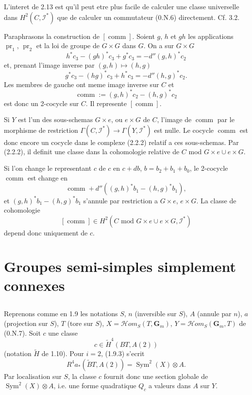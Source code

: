 \documentclass[11pt,a4paper]{article}
\theoremstyle{plain}
\theoremstyle{definition}
\DeclareMathOperator{\Sym}{Sym}
\DeclareMathOperator{\pr}{pr}
\DeclareMathOperator{\comm}{comm}
\begin{document}
L'interet de 2.13 est qu'il peut etre plus facile de calculer une classe universelle dans $H^2(C, \mathscr{I}^*)$ que de calculer un commutateur (0.N.6) directement. Cf. 3.2.

Paraphrasons la construction de $[\comm]$. Soient $g$, $h$ et $gh$ les applications $\pr_1$, $\pr_2$ et la loi de groupe de $G \times G$ dans $G$. On a sur $G \times G$
\[
h^* c_3 - (gh)^* c_3 + g^* c_3 = -d''(g, h)^* c_2
\]
et, prenant l'image inverse par $(g, h) \mapsto (h, g)$
\[
g^* c_3 - (hg)^* c_3 + h^* c_3 = -d''(h, g)^* c_2.
\]
Les membres de gauche ont meme image inverse sur $C$ et
\begin{equation}\label{2.14.1}
\comm := (g, h)^* c_2 - (h, g)^* c_2
\end{equation}
est donc un 2-cocycle sur $C$. Il represente $[\comm]$.

Si $Y$ est l'un des sous-schemas $G \times e$, ou $e \times G$ de $C$, l'image de $\comm$ par le morphisme de restriction $\Gamma(C, \mathscr{I}^*) \to \Gamma(Y, \mathscr{I}^*)$ est nulle. Le cocycle $\comm$ est donc encore un cocycle dans le complexe (2.2.2) relatif a ces sous-schemas. Par (2.2.2), il definit une classe dans la cohomologie relative de $C$ mod $G \times e \cup e \times G$.

Si l'on change le representant $c$ de $c$ en $c + db$, $b = b_2 + b_1 + b_0$, le 2-cocycle $\comm$ est change en
\[
\comm + d''((g, h)^* b_1 - (h, g)^* b_1),
\]
et $(g, h)^* b_1 - (h, g)^* b_1$ s'annule par restriction a $G \times e$, $e \times G$. La classe de cohomologie
\begin{equation}\label{2.14.2}
[\comm] \in H^2(C \text{ mod } G \times e \cup e \times G, \mathscr{I}^*)
\end{equation}
depend donc uniquement de $c$.

\section{Groupes semi-simples simplement connexes}

\subsection{}\label{3.1}

Reprenons comme en 1.9 les notations $S$, $n$ (inversible sur $S$), $A$ (annule par $n$), $a$ (projection sur $S$), $T$ (tore sur $S$), $X = \mathscr{H}om_S(T, \mathbf{G}_m)$, $Y = \mathscr{H}om_S(\mathbf{G}_m, T)$ de (0.N.7). Soit $c$ une classe
\[
c \in \widetilde{H}^4(BT, A(2))
\]
(notation $\widetilde{H}$ de 1.10). Pour $i = 2$, (1.9.3) s'ecrit
\[
R^4 a_*(\widetilde{B}T, A(2)) = \Sym^2(X) \otimes A.
\]
Par localisation sur $S$, la classe $c$ fournit donc une section globale de $\Sym^2(X) \otimes A$, i.e. une forme quadratique $Q_c$ a valeurs dans $A$ sur $Y$.
\end{document}
